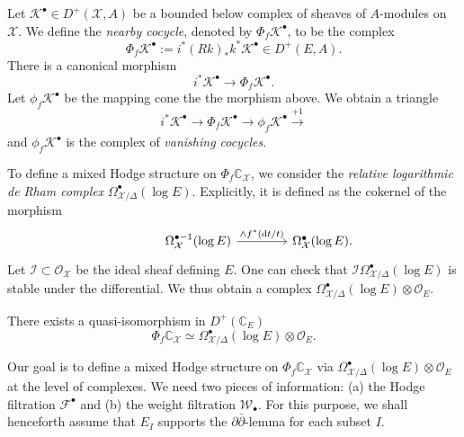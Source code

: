 \begin{definition}
    Let \(\mathscr{K}^{\bullet}\in D^{+}(\mathcal{X},A)\) be a bounded below complex
    of sheaves of \(A\)-modules on \(\mathcal{X}\). We define
    the \emph{nearby cocycle}, denoted by \(\Phi_{f}\mathscr{K}^{\bullet}\),
    to be the complex
    \begin{equation*}
        \Phi_{f}\mathscr{K}^{\bullet} := i^{\ast} (Rk)_{\ast} k^{\ast} \mathscr{K}^{\bullet}
        \in D^{+}(E,A).
    \end{equation*}
There is a canonical morphism
\begin{equation*}
    i^{\ast}\mathscr{K}^{\bullet}\to \Phi_{f}\mathscr{K}^{\bullet}.
\end{equation*}
Let \(\phi_{f}\mathscr{K}^{\bullet}\) be the mapping cone the 
the morphism above. We obtain a triangle
\begin{equation*}
    i^{\ast}\mathscr{K}^{\bullet}\to \Phi_{f}\mathscr{K}^{\bullet}\to \phi_{f}\mathscr{K}^{\bullet}
    \xrightarrow[]{+1}
\end{equation*}
and \(\phi_{f}\mathscr{K}^{\bullet}\) is 
the complex of \emph{vanishing cocycles}.
\end{definition}
To define a mixed Hodge structure on 
\(\Phi_{f}\mathbb{C}_{\mathcal{X}}\), we
consider the \emph{relative logarithmic de Rham complex}
\(\Omega^{\bullet}_{\mathcal{X}\slash \Delta}(\log E)\).
Explicitly, it is defined as the cokernel of the morphism
\begin{eqnarray*}
\begin{tikzcd}[column sep=4em]
&\Omega^{\bullet-1}_{\mathcal{X}}(\log E)\ar[r,"\wedge f^{\ast}(\mathrm{d}t\slash t)"]
&\Omega^{\bullet}_{\mathcal{X}}(\log E).
\end{tikzcd}
\end{eqnarray*}
Let \(\mathcal{I}\subset\mathscr{O}_{\mathcal{X}}\) 
be the ideal sheaf defining \(E\).
One can check that \(\mathcal{I}\Omega^{\bullet}_{\mathcal{X}\slash \Delta}(\log E)\)
is stable under the differential.
We thus obtain a complex 
\(\Omega^{\bullet}_{\mathcal{X}\slash \Delta}(\log E)\otimes\mathscr{O}_{E}\).
\begin{theorem}
There exists a quasi-isomorphism in \(D^{+}(\mathbb{C}_{E})\)
\begin{equation*}
    \Phi_{f}\mathbb{C}_{\mathcal{X}}\simeq
    \Omega^{\bullet}_{\mathcal{X}\slash \Delta}(\log E)\otimes\mathscr{O}_{E}.
\end{equation*}
\end{theorem}
Our goal is to define a mixed Hodge structure on \(\Phi_{f}\mathbb{C}_{\mathcal{X}}\)
via \(\Omega^{\bullet}_{\mathcal{X}\slash \Delta}(\log E)\otimes\mathscr{O}_{E}\)
at the level of complexes. We need two pieces of information:
(a) the Hodge filtration \(\mathcal{F}^{\bullet}\) 
and (b) the weight filtration \(\mathcal{W}_{\bullet}\).
For this purpose, we shall henceforth assume that 
\(E_{I}\) supports the \(\partial\bar{\partial}\)-lemma
for each subset \(I\).

